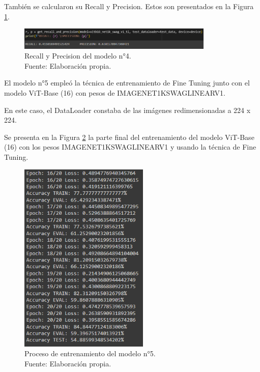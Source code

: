 También se calcularon su Recall y Precision. Estos son presentados en la Figura \ref{4:fig127}.

\begin{figure}[H]
	\begin{center}
		\includegraphics[width=0.83\textwidth]{4/figures/model4_rp.PNG}
		\caption[Recall y Precision del modelo n°4]{Recall y Precision del modelo n°4. \\
		Fuente: Elaboración propia.}
		\label{4:fig127}
	\end{center}
\end{figure}

El modelo n°5 empleó la técnica de entrenamiento de Fine Tuning junto con el modelo ViT-Base (16) con pesos de IMAGENET1KSWAGLINEARV1.

En este caso, el DataLoader constaba de las imágenes redimensionadas a 224 x 224.

Se presenta en la Figura \ref{4:fig128} la parte final del entrenamiento del modelo ViT-Base (16) con los pesos IMAGENET1KSWAGLINEARV1 y usando la técnica de Fine Tuning.

\begin{figure}[H]
	\begin{center}
		\includegraphics[width=0.55\textwidth]{4/figures/model5_train.PNG}
		\caption[Proceso de entrenamiento del modelo n°5]{Proceso de entrenamiento del modelo n°5. \\
		Fuente: Elaboración propia.}
		\label{4:fig128}
	\end{center}
\end{figure}

